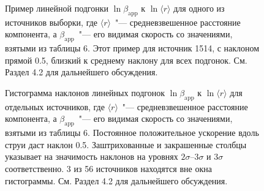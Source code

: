 \begin{figure}[tbh]
 \caption{Пример линейной подгонки $\ln \beta_\text{app}$ к $\ln\langle{r}\rangle$ для одного из
источников выборки, где $\langle{r}\rangle$~"--- средневзвешенное расстояние компонента, а
$\beta_\text{app}$~"--- его видимая скорость со значениями, взятыми из таблицы 6. Этот пример для
источник 1514, с наклоном прямой 0.5, близкий к среднему наклону для всех
подгонок. См. Раздел 4.2 для дальнейшего обсуждения.}
 \label{fig:rdv_beta_app_vs_r}
\end{figure}

\begin{figure}[tbh]
 \caption{Гистограмма наклонов линейных подгонок $\ln \beta_\text{app}$ к $\ln\langle{r}\rangle$ для
отдельных источников, где $\langle{r}\rangle$~"--- средневзвешенное расстояние компонента, а
$\beta_\text{app}$~"--- его видимая скорость со значениями, взятыми из таблицы 6. Постоянное
положительное ускорение вдоль струи даст наклон 0.5. Заштрихованные и закрашенные столбцы указывает
на значимость наклонов на уровнях $2\sigma$--$3\sigma$ и $3\sigma$ соответственно. 3 из 56
источников находятся вне окна гистограммы. См. Раздел 4.2 для дальнейшего обсуждения.}
 \label{fig:rdv_hist_beta_app_vs_r}
\end{figure}

